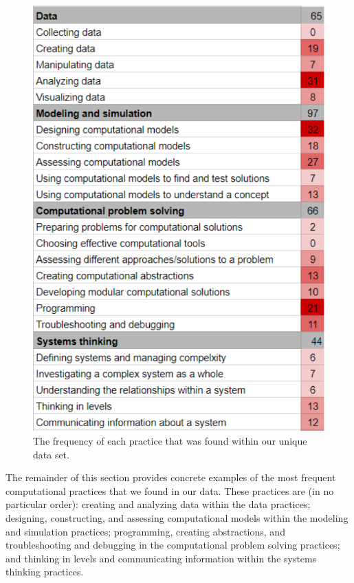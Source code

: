 \documentclass{msuphddissertation}
\begin{document}
\begin{doublespace}
\begin{figure}\centering
\includegraphics[scale=0.65]{./images/CH5DensityPlot.pdf}
\caption{The frequency of each practice that was found within our unique data set.}\label{CH5:DensityPlot}
\end{figure}

The remainder of this section provides concrete examples of the most frequent computational practices that we found in our data.  These practices are (in no particular order): creating and analyzing data within the data practices; designing, constructing, and assessing computational models within the modeling and simulation practices; programming, creating abstractions, and troubleshooting and debugging in the computational problem solving practices; and thinking in levels and communicating information within the systems thinking practices.


\end{doublespace}
\end{document}
